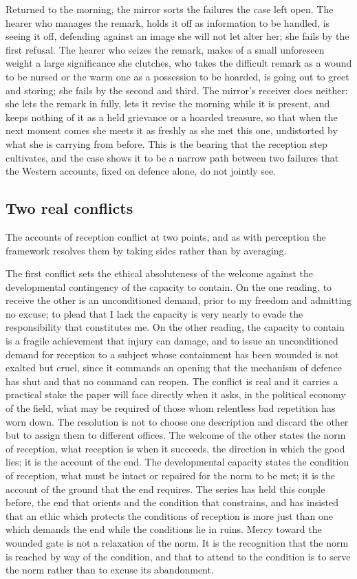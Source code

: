Returned to the morning, the mirror sorts the failures the case left open. The hearer who manages the remark, holds it off as information to be handled, is seeing it off, defending against an image she will not let alter her; she fails by the first refusal. The hearer who seizes the remark, makes of a small unforeseen weight a large significance she clutches, who takes the difficult remark as a wound to be nursed or the warm one as a possession to be hoarded, is going out to greet and storing; she fails by the second and third. The mirror's receiver does neither: she lets the remark in fully, lets it revise the morning while it is present, and keeps nothing of it as a held grievance or a hoarded treasure, so that when the next moment comes she meets it as freshly as she met this one, undistorted by what she is carrying from before. This is the bearing that the reception step cultivates, and the case shows it to be a narrow path between two failures that the Western accounts, fixed on defence alone, do not jointly see.

\subsection{Two real conflicts}
\label{p22:sub:reception-conflicts}

The accounts of reception conflict at two points, and as with perception the framework resolves them by taking sides rather than by averaging.

The first conflict sets the ethical absoluteness of the welcome against the developmental contingency of the capacity to contain. On the one reading, to receive the other is an unconditioned demand, prior to my freedom and admitting no excuse; to plead that I lack the capacity is very nearly to evade the responsibility that constitutes me. On the other reading, the capacity to contain is a fragile achievement that injury can damage, and to issue an unconditioned demand for reception to a subject whose containment has been wounded is not exalted but cruel, since it commands an opening that the mechanism of defence has shut and that no command can reopen. The conflict is real and it carries a practical stake the paper will face directly when it asks, in the political economy of the field, what may be required of those whom relentless bad repetition has worn down. The resolution is not to choose one description and discard the other but to assign them to different offices. The welcome of the other states the norm of reception, what reception is when it succeeds, the direction in which the good lies; it is the account of the end. The developmental capacity states the condition of reception, what must be intact or repaired for the norm to be met; it is the account of the ground that the end requires. The series has held this couple before, the end that orients and the condition that constrains, and has insisted that an ethic which protects the conditions of reception is more just than one which demands the end while the conditions lie in ruins. Mercy toward the wounded gate is not a relaxation of the norm. It is the recognition that the norm is reached by way of the condition, and that to attend to the condition is to serve the norm rather than to excuse its abandonment.

